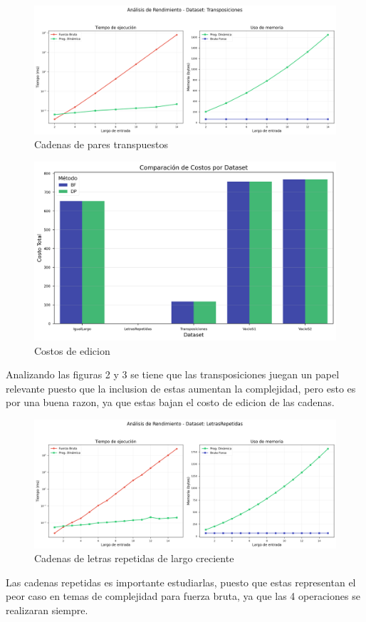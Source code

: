 \begin{figure}[H]
    \centering
        \includegraphics[width=\textwidth]{images/Transposiciones_analisis.png}
    \caption{Cadenas de pares transpuestos}
    \label{fig:scatterplot_2}
\end{figure}
\begin{figure}[H]
    \centering
    \begin{minipage}[t]{0.5\textwidth}
        \includegraphics[width=\textwidth]{images/costos_por_dataset.png}
    \end{minipage}%
    \caption{Costos de edicion}
    \label{fig:barplot_1}
\end{figure}
Analizando las figuras 2 y 3 se tiene que las transposiciones juegan un papel relevante puesto que la inclusion de estas aumentan la complejidad, pero esto es por una buena razon,
ya que estas bajan el costo de edicion de las cadenas.

\begin{figure}[H]
    \centering
        \includegraphics[width=\textwidth]{images/LetrasRepetidas_analisis.png}
    \caption{Cadenas de letras repetidas de largo creciente}
    \label{fig:scatterplot_4}
\end{figure}
Las cadenas repetidas es importante estudiarlas, puesto que estas representan el peor caso en temas de complejidad para fuerza bruta, ya que
las 4 operaciones se realizaran siempre.

